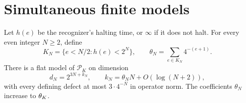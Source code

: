 \section{Simultaneous finite models}\label{sec:finite}
\begin{theorem}\label{thm:finite}
Let $h(e)$ be the recognizer's halting time, or $\infty$ if it does not halt. For every even integer $N\ge2$, define
\[
 K_N=\{e<N/2:h(e)<2^N\},
 \qquad\theta_N=\sum_{e\in K_N}4^{-(e+1)}.
\]
There is a flat model of $\mathcal P_K$ on dimension
\begin{equation}\label{eq:finite-dimension}
 d_N=2^{3N+k_N},\qquad k_N=\theta_NN+O(\log(N+2)),
\end{equation}
with every defining defect at most $3\cdot4^{-N}$ in operator norm. The coefficients $\theta_N$ increase to $\theta_K$.
\end{theorem}
